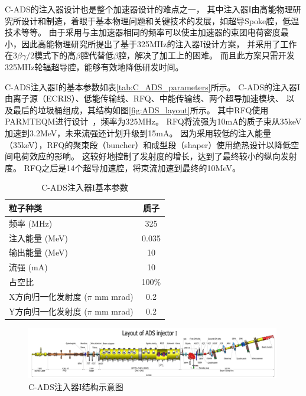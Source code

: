 C-ADS的注入器设计也是整个加速器设计的难点之一，
其中注入器I由高能物理研究所设计和制造，着眼于基本物理问题和关键技术的发展，如超导Spoke腔，低温技术等等。
由于采用与主加速器相同的频率可以使主加速器的束团电荷密度最小，因此高能物理研究所提出了基于325MHz的注入器I设计方案，
并采用了工作在$3 \beta \gamma /2$模式下的高$\beta$腔代替低$\beta$腔，解决了加工上的困难。
而且此方案只需开发325MHz轮辐超导腔，能够有效地降低研发时间。

C-ADS注入器I的基本参数如表\eqref{tab:C_ADS_parameters}所示。
C-ADS的注入器I由离子源（ECRIS）、低能传输线、RFQ、中能传输线、两个超导加速模块、
以及最后的垃圾桶组成，其结构如图\eqref{fig:ADS_layout}所示。
其中RFQ使用PARMTEQM进行设计~\cite{PARMTEQ_6925500,crandall1998rfq}，频率为325MHz。
RFQ将流强为10mA的质子束从35keV加速到3.2MeV，未来流强还计划升级到15mA。
因为采用较低的注入能量（35keV），RFQ的聚束段（buncher）和成型段（shaper）使用绝热设计以降低空间电荷效应的影响。
这较好地控制了发射度的增长，达到了最终较小的纵向发射度。
RFQ之后是14个超导加速腔，将束流加速到最终的10MeV。

\begin{table}[!bthp]
    \centering
    \footnotesize%
    \setlength{\tabcolsep}{4pt}%
    \renewcommand{\arraystretch}{1.2}%
    \caption{C-ADS注入器I基本参数}
    \begin{tabular}{lc}
        \hline\hline
        粒子种类                     & 质子 \\
        \hline
        频率 (MHz)        & 325       \\
        \hline
        注入能量 (MeV)    & 0.035     \\
        \hline
        输出能量 (MeV)    & 10        \\
        \hline
        流强 (mA)         & 10        \\
        \hline
        占空比                          & 100\%     \\
        \hline
        X方向归一化发射度 ($\pi$ mm mrad)    & 0.2        \\
        \hline
        Y方向归一化发射度 ($\pi$ mm mrad)    & 0.2        \\
        \hline\hline
    \end{tabular}
    \label{tab:C_ADS_parameters}
\end{table}

\begin{figure}[!tbh]
    \centering
    \includegraphics[width=0.99\textwidth]{Img/Layout_of_ADS_Injector_I.jpg}
    \caption{C-ADS注入器I结构示意图}
    \label{fig:ADS_layout}
\end{figure}

